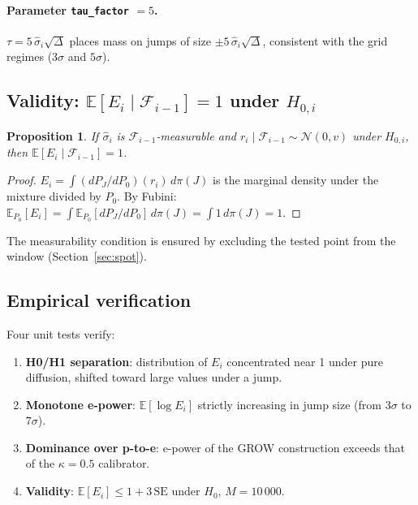 \documentclass[11pt,a4paper,twocolumn]{article}
\theoremstyle{plain}
\newtheorem{proposition}[theorem]{Proposition}
\theoremstyle{definition}
\theoremstyle{remark}
\newcommand{\E}{\mathbb{E}}
\newcommand{\dt}{\Delta}
\begin{document}
\paragraph{Parameter \texttt{tau\_factor} $= 5$.}
$\tau = 5\,\hat{\sigma}_i\sqrt{\dt}$ places mass on jumps of size
$\pm 5\,\hat{\sigma}_i\sqrt{\dt}$, consistent with the grid regimes
($3\sigma$ and $5\sigma$).

\subsection{Validity: $\E[E_i \mid \mathcal{F}_{i-1}] = 1$ under $H_{0,i}$}

\begin{proposition}\label{prop:valid}
If $\hat{\sigma}_i$ is $\mathcal{F}_{i-1}$-measurable and $r_i \mid \mathcal{F}_{i-1} \sim \mathcal{N}(0, v)$ under $H_{0,i}$, then $\E[E_i \mid \mathcal{F}_{i-1}] = 1$.
\end{proposition}

\begin{proof}
$E_i = \int (dP_J/dP_0)(r_i)\,d\pi(J)$ is the marginal density under the
mixture divided by $P_0$. By Fubini:
$\E_{P_0}[E_i] = \int \E_{P_0}[dP_J/dP_0]\,d\pi(J) = \int 1\,d\pi(J) = 1$.
\end{proof}

The measurability condition is ensured by excluding the tested point from
the window (Section~\ref{sec:spot}).

\subsection{Empirical verification}

Four unit tests verify:
\begin{enumerate}
  \item \textbf{H0/H1 separation}: distribution of $E_i$ concentrated near 1
    under pure diffusion, shifted toward large values under a jump.
  \item \textbf{Monotone e-power}: $\E[\log E_i]$ strictly increasing in jump
    size (from $3\sigma$ to $7\sigma$).
  \item \textbf{Dominance over p-to-e}: e-power of the GROW construction
    exceeds that of the $\kappa = 0.5$ calibrator.
  \item \textbf{Validity}: $\E[E_i] \le 1 + 3\,\mathrm{SE}$ under $H_0$,
    $M = 10\,000$.
\end{enumerate}
\end{document}
